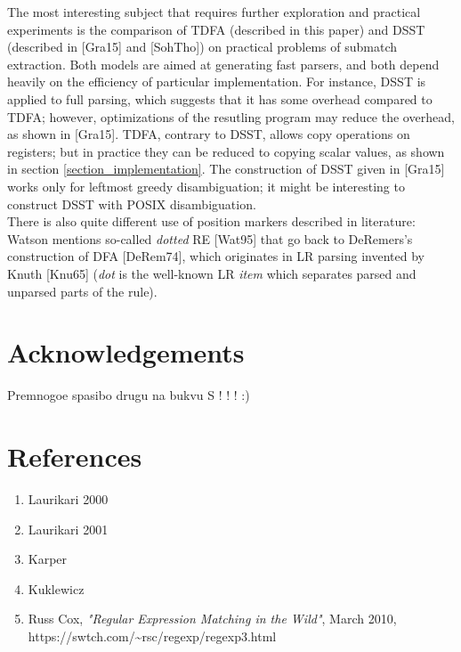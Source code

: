 \documentclass{article}
\theoremstyle{definition}
\begin{document}
\begin{multicols}{2}
The most interesting subject that requires further exploration and practical experiments
is the comparison of TDFA (described in this paper) and DSST (described in [Gra15] and [SohTho])
on practical problems of submatch extraction.
Both models are aimed at generating fast parsers,
and both depend heavily on the efficiency of particular implementation.
For instance, DSST is applied to full parsing, which suggests that it has some overhead compared to TDFA;
however, optimizations of the resutling program may reduce the overhead, as shown in [Gra15].
TDFA, contrary to DSST, allows copy operations on registers;
but in practice they can be reduced to copying scalar values, as shown in section \ref{section_implementation}.
The construction of DSST given in [Gra15] works only for leftmost greedy disambiguation;
it might be interesting to construct DSST with POSIX disambiguation.
\\

There is also quite different use of position markers described in literature:
Watson mentions so-called \emph{dotted} RE [Wat95]
that go back to DeRemers's construction of DFA [DeRem74],
which originates in LR parsing invented by Knuth [Knu65]
(\emph{dot} is the well-known LR \emph{item} which separates parsed and unparsed parts of the rule).

\section*{Acknowledgements}

Premnogoe spasibo drugu na bukvu S ! ! ! :)

\end{multicols}
\pagebreak

\section*{References}

\begin{enumerate}
\item Laurikari 2000
\item Laurikari 2001
\item Karper
\item Kuklewicz

    \item \! [Cox10] Russ Cox, \textit{"Regular Expression Matching in the Wild"}, March 2010, \\
        https://swtch.com/\textasciitilde rsc/regexp/regexp3.html

\end{enumerate}
\end{document}
